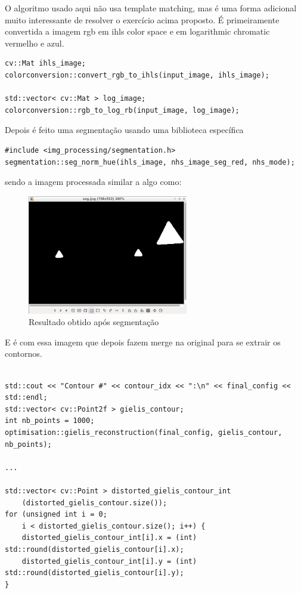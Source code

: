 \documentclass[portuguese, times, mirror]{revdetua}
\begin{document}
O algoritmo usado aqui não usa template matching, mas é uma forma adicional muito interessante de resolver o exercício acima proposto. É primeiramente convertida a imagem rgb em ihls color space e em logarithmic chromatic vermelho e azul.

\begin{lstlisting}[caption=Image convertion,label=code:C]
 cv::Mat ihls_image;
colorconversion::convert_rgb_to_ihls(input_image, ihls_image);

std::vector< cv::Mat > log_image;
colorconversion::rgb_to_log_rb(input_image, log_image);
\end{lstlisting}

Depois é feito uma segmentação usando uma biblioteca específica \begin{lstlisting}[caption=Biblioteca usada,label=code:C]
#include <img_processing/segmentation.h>
segmentation::seg_norm_hue(ihls_image, nhs_image_seg_red, nhs_mode);
\end{lstlisting}

sendo a imagem processada similar a algo como:


\begin{figure}[ht!]
\centering
\includegraphics[width=70mm]{img/ex_adicional_seg.png}
\caption{Resultado obtido após segmentação}
\end{figure}

E é com essa imagem que depois fazem merge na original para se extrair os contornos.

\begin{lstlisting}[caption=Reconstrução do contorno,label=code:C]

std::cout << "Contour #" << contour_idx << ":\n" << final_config << std::endl;
std::vector< cv::Point2f > gielis_contour;
int nb_points = 1000;
optimisation::gielis_reconstruction(final_config, gielis_contour, nb_points);

...
        
std::vector< cv::Point > distorted_gielis_contour_int
    (distorted_gielis_contour.size());
for (unsigned int i = 0; 
    i < distorted_gielis_contour.size(); i++) {
    distorted_gielis_contour_int[i].x = (int) std::round(distorted_gielis_contour[i].x);
    distorted_gielis_contour_int[i].y = (int) std::round(distorted_gielis_contour[i].y);
}

\end{lstlisting}
\end{document}

